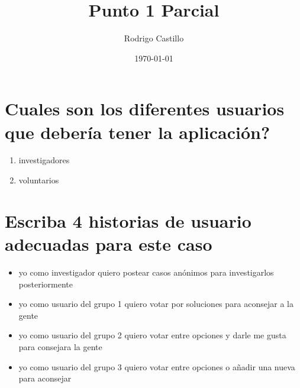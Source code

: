 \documentclass[10pt,a4paper]{article} %
\begin{document}
    \title{{  Punto 1 Parcial  }}
    \author{{Rodrigo Castillo}}
    \date{\today}

    \maketitle


    \section{Cuales son los diferentes usuarios que debería tener la aplicación?}
        \begin{enumerate}
            \item {investigadores}
            \item {voluntarios}
        \end{enumerate}

    \section{Escriba 4 historias de usuario adecuadas para este caso}
        \begin{itemize}
            \item {yo como investigador quiero postear casos anónimos para
                investigarlos posteriormente}
            \item {yo como usuario del grupo 1 quiero votar por soluciones para
                aconsejar a la gente}
            \item {yo como usuario del grupo 2 quiero votar entre opciones y
                darle me gusta para consejara la gente}
            \item {yo como usuario del grupo 3 quiero votar entre opciones o
                añadir una nueva para aconsejar}
        \end{itemize}
\end{document}
